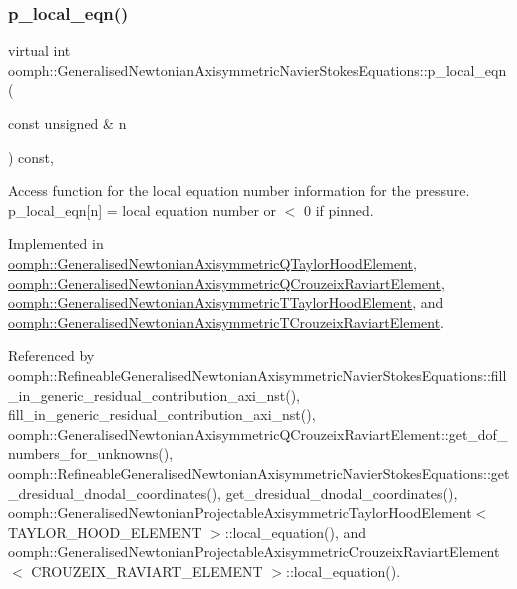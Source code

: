 \subsubsection{\texorpdfstring{p\+\_\+local\+\_\+eqn()}{p\_local\_eqn()}}
{\footnotesize\ttfamily virtual int oomph\+::\+Generalised\+Newtonian\+Axisymmetric\+Navier\+Stokes\+Equations\+::p\+\_\+local\+\_\+eqn (\begin{DoxyParamCaption}\item[{const unsigned \&}]{n }\end{DoxyParamCaption}) const\hspace{0.3cm}{\ttfamily [protected]}, {}}



Access function for the local equation number information for the pressure. p\+\_\+local\+\_\+eqn\mbox{[}n\mbox{]} = local equation number or $<$ 0 if pinned. 



Implemented in \hyperlink{classoomph_1_1GeneralisedNewtonianAxisymmetricQTaylorHoodElement_a668055f81b262fd80821d1cecce66d0f}{oomph\+::\+Generalised\+Newtonian\+Axisymmetric\+Q\+Taylor\+Hood\+Element}, \hyperlink{classoomph_1_1GeneralisedNewtonianAxisymmetricQCrouzeixRaviartElement_a96e455aa73cdc037153ccb6365f6b29c}{oomph\+::\+Generalised\+Newtonian\+Axisymmetric\+Q\+Crouzeix\+Raviart\+Element}, \hyperlink{classoomph_1_1GeneralisedNewtonianAxisymmetricTTaylorHoodElement_adab05003b0136131aa4ca7bcafd32c02}{oomph\+::\+Generalised\+Newtonian\+Axisymmetric\+T\+Taylor\+Hood\+Element}, and \hyperlink{classoomph_1_1GeneralisedNewtonianAxisymmetricTCrouzeixRaviartElement_a15be96962f316650fdcec3b48345f0b7}{oomph\+::\+Generalised\+Newtonian\+Axisymmetric\+T\+Crouzeix\+Raviart\+Element}.



Referenced by oomph\+::\+Refineable\+Generalised\+Newtonian\+Axisymmetric\+Navier\+Stokes\+Equations\+::fill\+\_\+in\+\_\+generic\+\_\+residual\+\_\+contribution\+\_\+axi\+\_\+nst(), fill\+\_\+in\+\_\+generic\+\_\+residual\+\_\+contribution\+\_\+axi\+\_\+nst(), oomph\+::\+Generalised\+Newtonian\+Axisymmetric\+Q\+Crouzeix\+Raviart\+Element\+::get\+\_\+dof\+\_\+numbers\+\_\+for\+\_\+unknowns(), oomph\+::\+Refineable\+Generalised\+Newtonian\+Axisymmetric\+Navier\+Stokes\+Equations\+::get\+\_\+dresidual\+\_\+dnodal\+\_\+coordinates(), get\+\_\+dresidual\+\_\+dnodal\+\_\+coordinates(), oomph\+::\+Generalised\+Newtonian\+Projectable\+Axisymmetric\+Taylor\+Hood\+Element$<$ T\+A\+Y\+L\+O\+R\+\_\+\+H\+O\+O\+D\+\_\+\+E\+L\+E\+M\+E\+N\+T $>$\+::local\+\_\+equation(), and oomph\+::\+Generalised\+Newtonian\+Projectable\+Axisymmetric\+Crouzeix\+Raviart\+Element$<$ C\+R\+O\+U\+Z\+E\+I\+X\+\_\+\+R\+A\+V\+I\+A\+R\+T\+\_\+\+E\+L\+E\+M\+E\+N\+T $>$\+::local\+\_\+equation().

